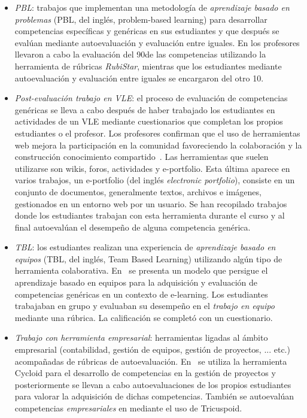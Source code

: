 \begin{itemize}
\item \emph{PBL}: trabajos que implementan una metodología de \emph{aprendizaje basado en problemas} (PBL, del inglés, problem-based learning) para desarrollar competencias específicas y genéricas en sus estudiantes y que después se evalúan mediante autoevaluación y evaluación entre iguales. En \cite{lasa2013problem} los profesores llevaron a cabo la evaluación del 90\percentage de las competencias utilizando la herramienta de rúbricas \emph{RubiStar}, mientras que los estudiantes mediante autoevaluación y evaluación entre iguales se encargaron del otro 10\percentage. 
\item \emph{Post-evaluación trabajo en VLE}:  el proceso de evaluación de competencias genéricas se lleva a cabo después de haber trabajado los estudiantes en actividades de un VLE mediante cuestionarios que completan los propios estudiantes o el profesor. Los profesores confirman que el uso de herramientas web mejora la participación en la comunidad favoreciendo la colaboración y la construcción conocimiento compartido~\cite{starcic2008sustaining}. Las herramientas que suelen utilizarse son wikis, foros, actividades y e-portfolio. Esta última aparece en varios trabajos, un e-portfolio (del inglés \emph{electronic portfolio}), consiste en un conjunto de documentos, generalmente textos, archivos e imágenes, gestionados en un entorno web por un usuario. Se han recopilado trabajos donde los estudiantes trabajan con esta herramienta durante el curso y al final autoevalúan el desempeño de alguna competencia genérica\cite{arno2011promoting}. 
\item \emph{TBL}: los estudiantes realizan una experiencia de \emph{aprendizaje basado en equipos} (TBL, del inglés, Team Based Learning) utilizando algún tipo de herramienta colaborativa. En~\cite{ficapal2015learning} se presenta un modelo que persigue el aprendizaje basado en equipos para la adquisición y evaluación de competencias genéricas en un contexto de e-learning. Los estudiantes trabajaban en grupo y evaluaban su desempeño en el \emph{trabajo en equipo} mediante una rúbrica. La calificación se completó con un cuestionario.
\item \emph{Trabajo con herramienta empresarial}: herramientas ligadas al ámbito empresarial (contabilidad, gestión de equipos, gestión de proyectos, ... etc.) acompañadas de rúbricas de autoevaluación.  En~\cite{chang2009international} se utiliza la herramienta Cycloid para el desarrollo de competencias en la gestión de proyectos y posteriormente se llevan a cabo autoevaluaciones de los propios estudiantes para valorar la adquisición de dichas competencias. También se autoevalúan competencias \emph{empresariales} en  \cite{achcaoucaou2014competence} mediante el uso de Tricuspoid. 

\end{itemize}
